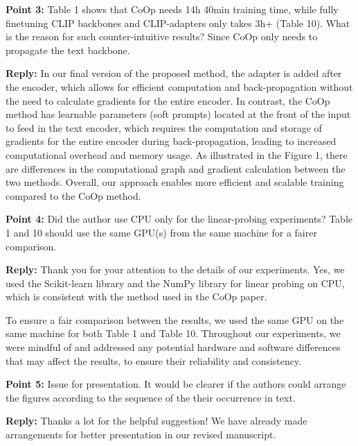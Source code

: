 \documentclass[default]{sn-jnl}%
\theoremstyle{thmstyleone}%
\theoremstyle{thmstyletwo}%
\theoremstyle{thmstylethree}%
\begin{document}
\vspace{5pt}
\noindent \textbf{Point 3:} Table 1 shows that CoOp needs 14h 40min training time, while fully finetuning CLIP backbones and CLIP-adapters only takes 3h+ (Table 10). What is the reason for such counter-intuitive results? Since CoOp only needs to propagate the text backbone.

\noindent \textbf{Reply:} In our final version of the proposed method, the adapter is added after the encoder, which allows for efficient computation and back-propagation without the need to calculate gradients for the entire encoder. In contrast, the CoOp method has learnable parameters (soft prompts) located at the front of the input to feed in the text encoder, which requires the computation and storage of gradients for the entire encoder during back-propagation, leading to increased computational overhead and memory usage. As illustrated in the Figure 1, there are differences in the computational graph and gradient calculation between the two methods. Overall, our approach enables more efficient and scalable training compared to the CoOp method.

\vspace{5pt}
\noindent \textbf{Point 4:} 
Did the author use CPU only for the linear-probing experiments? Table 1 and 10 should use the same GPU(s) from the same machine for a fairer comparison.

\noindent \textbf{Reply:} Thank you for your attention to the details of our experiments. Yes, we used the Scikit-learn library and the NumPy library for linear probing on CPU, which is consistent with the method used in the CoOp paper. 

To ensure a fair comparison between the results, we used the same GPU on the same machine for both Table 1 and Table 10. Throughout our experiments, we were mindful of and addressed any potential hardware and software differences that may affect the results, to ensure their reliability and consistency. 

\vspace{5pt}
\noindent \textbf{Point 5:} Issue for presentation. It would be clearer if the authors could arrange the figures according to the sequence of the their occurrence in text. 


\noindent \textbf{Reply:} Thanks a lot for the helpful suggestion! We have already made arrangements for better presentation in our revised manuscript.
\end{document}
